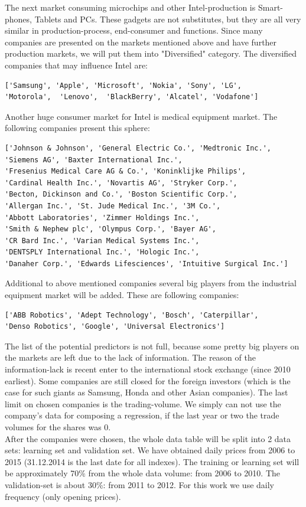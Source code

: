 \documentclass{article}
\begin{document}
The next market consuming microchips and other Intel-production is Smart-phones, Tablets and PCs. These gadgets are not substitutes, but they are all very similar in production-process, end-consumer and functions. Since many companies are presented on the markets mentioned above and have further production markets, we will put them into "Diversified" category. The diversified companies that may influence Intel are:
\begin{verbatim}
['Samsung', 'Apple', 'Microsoft', 'Nokia', 'Sony', 'LG',
'Motorola',  'Lenovo',  'BlackBerry', 'Alcatel', 'Vodafone']
\end{verbatim} 
Another huge consumer market for Intel is medical equipment market. The following companies present this sphere:
\begin{verbatim}
['Johnson & Johnson', 'General Electric Co.', 'Medtronic Inc.',
'Siemens AG', 'Baxter International Inc.', 
'Fresenius Medical Care AG & Co.', 'Koninklijke Philips',
'Cardinal Health Inc.', 'Novartis AG', 'Stryker Corp.',
'Becton, Dickinson and Co.', 'Boston Scientific Corp.',
'Allergan Inc.', 'St. Jude Medical Inc.', '3M Co.',
'Abbott Laboratories', 'Zimmer Holdings Inc.', 
'Smith & Nephew plc', 'Olympus Corp.', 'Bayer AG',
'CR Bard Inc.', 'Varian Medical Systems Inc.',
'DENTSPLY International Inc.', 'Hologic Inc.', 
'Danaher Corp.', 'Edwards Lifesciences', 'Intuitive Surgical Inc.']
\end{verbatim}
Additional to above mentioned companies several big players from the industrial equipment market will be added. These are following companies:
\begin{verbatim}
['ABB Robotics', 'Adept Technology', 'Bosch', 'Caterpillar',
'Denso Robotics', 'Google', 'Universal Electronics']
\end{verbatim}
The list of the potential predictors is not full, because some pretty big players on the markets are left due to the lack of information. The reason of the information-lack is recent enter to the international stock exchange (since 2010 earliest). Some companies are still closed for the foreign investors (which is the case for such giants as Samsung, Honda and other Asian companies). The last limit on chosen companies is the trading-volume. We simply can not use the company's data for composing a regression, if the last year or two the trade volumes for the shares was 0.\\
After the companies were chosen, the whole data table will be split into 2 data sets: learning set and validation set. We have obtained daily prices from 2006 to 2015 (31.12.2014 is the last date for all indexes). The training or learning set will be approximately 70\% from the whole data volume: from 2006 to 2010. The validation-set is about 30\%: from 2011 to 2012. For this work we use daily frequency (only opening prices).\\
\end{document}
